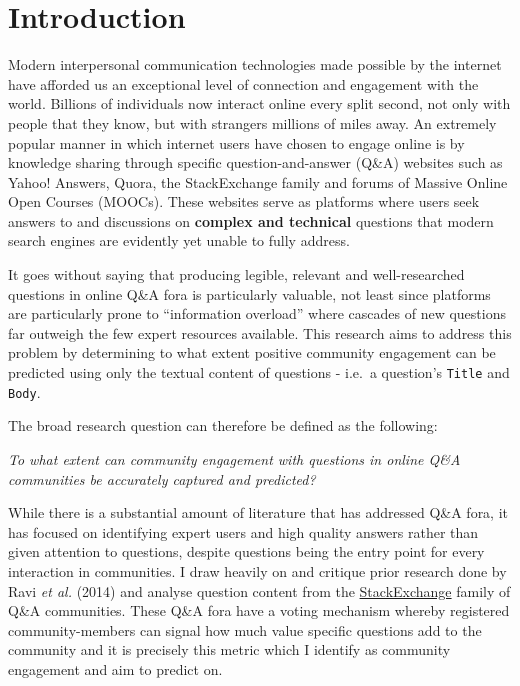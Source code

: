 \documentclass[11pt,preprint, authoryear]{article}
\numberwithin{equation}{section}
\begin{document}
\clearpage


\newpage

\section{\texorpdfstring{Introduction
\label{Intro}}{Introduction }}\label{introduction}

Modern interpersonal communication technologies made possible by the
internet have afforded us an exceptional level of connection and
engagement with the world. Billions of individuals now interact online
every split second, not only with people that they know, but with
strangers millions of miles away. An extremely popular manner in which
internet users have chosen to engage online is by knowledge sharing
through specific question-and-answer (Q\&A) websites such as Yahoo!
Answers, Quora, the StackExchange family and forums of Massive Online
Open Courses (MOOCs). These websites serve as platforms where users seek
answers to and discussions on \textbf{complex and technical} questions
that modern search engines are evidently yet unable to fully address.

It goes without saying that producing legible, relevant and
well-researched questions in online Q\&A fora is particularly valuable,
not least since platforms are particularly prone to ``information
overload'' where cascades of new questions far outweigh the few expert
resources available. This research aims to address this problem by
determining to what extent positive community engagement can be
predicted using only the textual content of questions - i.e.~a
question's \texttt{Title} and \texttt{Body}.

The broad research question can therefore be defined as the following:

\begin{center}
\emph{To what extent can community engagement with questions in online Q\&A communities be accurately captured and predicted?}
\end{center}

While there is a substantial amount of literature that has addressed
Q\&A fora, it has focused on identifying expert users and high quality
answers rather than given attention to questions, despite questions
being the entry point for every interaction in communities. I draw
heavily on and critique prior research done by Ravi \emph{et al.} (2014)
and analyse question content from the
\href{https://stackexchange.com/sites\#}{StackExchange} family of Q\&A
communities. These Q\&A fora have a voting mechanism whereby registered
community-members can signal how much value specific questions add to
the community and it is precisely this metric which I identify as
community engagement and aim to predict on.
\end{document}
